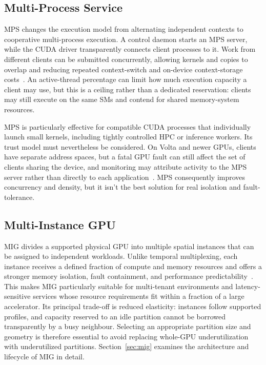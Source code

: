 \subsection{Multi-Process Service}

MPS changes the execution model from alternating independent contexts to cooperative multi-process execution. A control daemon starts an MPS server, while the CUDA driver transparently connects client processes to it. Work from different clients can be submitted concurrently, allowing kernels and copies to overlap and reducing repeated context-switch and on-device context-storage costs~\cite{nvidia2026mps}. An active-thread percentage can limit how much execution capacity a client may use, but this is a ceiling rather than a dedicated reservation: clients may still execute on the same SMs and contend for shared memory-system resources.

MPS is particularly effective for compatible CUDA processes that individually launch small kernels, including tightly controlled HPC or inference workers. Its trust model must nevertheless be considered. On Volta and newer GPUs, clients have separate address spaces, but a fatal GPU fault can still affect the set of clients sharing the device, and monitoring may attribute activity to the MPS server rather than directly to each application~\cite{nvidia2026mpsconsiderations}. MPS consequently improves concurrency and density, but it isn't the best solution for real isolation and fault-tolerance.

\subsection{Multi-Instance GPU}

MIG divides a supported physical GPU into multiple spatial instances that can be assigned to independent workloads. Unlike temporal multiplexing, each instance receives a defined fraction of compute and memory resources and offers a stronger memory isolation, fault containment, and performance predictability~\cite{nvidia2026mig}. This makes MIG particularly suitable for multi-tenant environments and latency-sensitive services whose resource requirements fit within a fraction of a large accelerator. Its principal trade-off is reduced elasticity: instances follow supported profiles, and capacity reserved to an idle partition cannot be borrowed transparently by a busy neighbour. Selecting an appropriate partition size and geometry is therefore essential to avoid replacing whole-GPU underutilization with underutilized partitions. Section~\ref{sec:mig} examines the architecture and lifecycle of MIG in detail.

